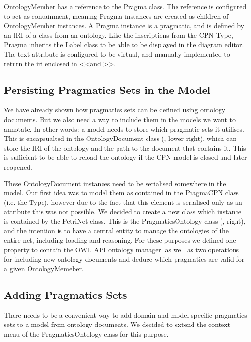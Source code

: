 OntologyMember has a reference to the Pragma class. The reference is
configured to act as containment, meaning Pragma instances are created as
children of OntologyMember instances. A Pragma instance is a pragmatic, and is
defined by an IRI of a class from an ontology. Like the inscriptions from the
CPN Type, Pragma inherits the Label class to be able to be displayed in the
diagram editor. The text attribute is configured to be virtual, and manually
implemented to return the iri enclosed in \textless\textless and
\textgreater\textgreater.

\subsection{Persisting Pragmatics Sets in the Model}
We have already shown how pragmatics sets can be defined using ontology
documents. But we also need a way to include them in the models we want to
annotate. In other words: a model needs to store which pragmatic sets it
utilises. This is encapsualted in the OntologyDocument class
(, lower right), which can store the IRI of the
ontology and the path to the document that contains it. This is sufficient to be
able to reload the ontology if the CPN model is closed and later reopened.

These OntologyDocument instances need to be serialised somewhere in the model.
Our first idea was to model them as contained in the PragmaCPN class (i.e.
the Type), however due to the fact that this element is serialised only as an
attribute this was not possible. We decided to create a new class which instance
is contained by the PetriNet class. This is the PragmaticsOntology class
(, right), and the intention is to have a central
entity to manage the ontologies of the entire net, including loading and
reasoning. For these purposes we defined one property to contain the OWL API
ontology manager, as well as two operations for including new ontology documents
and deduce which pragmatics are valid for a given OntologyMemeber.

\subsection{Adding Pragmatics Sets}\label{sec:menufirsttime}
There needs to be a convenient way to add domain and model specific pragmatics
sets to a model from ontology documents. We decided to extend the context menu
of the PragmaticsOntology class for this purpose.

